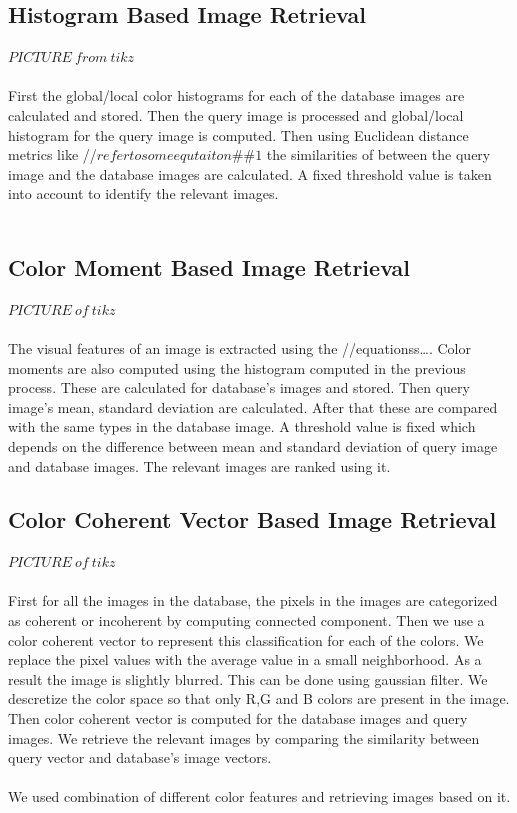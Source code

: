 \documentclass{report}
\begin{document}
\subsection{Histogram Based Image Retrieval}
$PICTURE\: from\: tikz$\\
\\
First the global/local color histograms for each of the database images are calculated and stored. Then the query image is processed and global/local histogram for the query image is computed. Then using Euclidean distance metrics like //$refer to some equtaiton \#\#1$ the similarities of between the query image and the database images are calculated. A fixed threshold value is taken into account to identify the relevant images.\\
\\
\subsection{Color Moment Based Image Retrieval}
$PICTURE\: of\: tikz$\\
\\
The visual features of an image is extracted using the //equationss…. Color moments are also computed using the histogram computed in the previous process. These are calculated for database’s images and stored. Then query image’s mean, standard deviation are calculated. After that these are compared with the same types in the database image. A threshold value is fixed which depends on the difference between mean and standard deviation of query image and database images. The relevant images are ranked using it.\\
\subsection{Color Coherent Vector Based Image Retrieval}
$PICTURE\: of\: tikz$\\
\\
First for all the images in the database, the pixels in the images are categorized as coherent or incoherent by computing connected component. Then we use a  color coherent vector to represent this classification for each of the colors. We replace the  pixel values with the average value in a small neighborhood. As a result the image is slightly blurred. This can be done using gaussian filter. We descretize the color space so that only R,G and B colors are present in the image. Then color coherent vector is computed for the database images and query images. We retrieve the relevant images by comparing the similarity between query vector and database’s image vectors.\\
\\
We used combination of different color features and retrieving images based on it.\\
\end{document}
